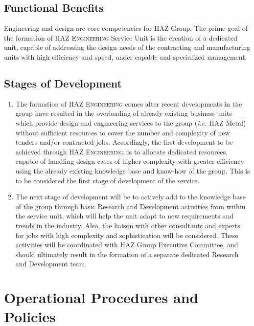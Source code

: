 \documentclass[a4paper,oneside,12pt,final]{article}
\begin{document}
\subsection{Functional Benefits}

Engineering and design are core competencies for HAZ Group. The prime goal of the formation of \textsc{HAZ Engineering} Service Unit is the creation of a dedicated unit, capable of addressing the design needs of the contracting and manufacturing units with high efficiency and speed, under capable and specialized management.

\subsection{Stages of Development}
\label{sec:development}
\begin{enumerate}[label=\Alph*.]
	\item The formation of \textsc{HAZ Engineering} comes after recent developments in the group have resulted in the overloading of already existing business units which provide design and engineering services to the group (\emph{i.e.} HAZ Metal) without sufficient resources to cover the number and complexity of new tenders and/or contracted jobs. Accordingly, the first development to be achieved through \textsc{HAZ Engineering}, is to allocate dedicated resources, capable of handling design cases of higher complexity with greater efficiency using the already existing knowledge base and know-how of the group. This is to be considered the first stage of development of the service. 
	\item The next stage of development will be to actively add to the knowledge base of the group through basic Research and Development activities from within the service unit, which will help the unit adapt to new requirements and trends in the industry. Also, the liaison with other consultants and experts for jobs with high complexity and sophistication will be considered. These activities will be coordinated with HAZ Group Executive Committee, and should ultimately result in the formation of a separate dedicated Research and Development team.
\end{enumerate}
 
\section{Operational Procedures and Policies}
\end{document}
